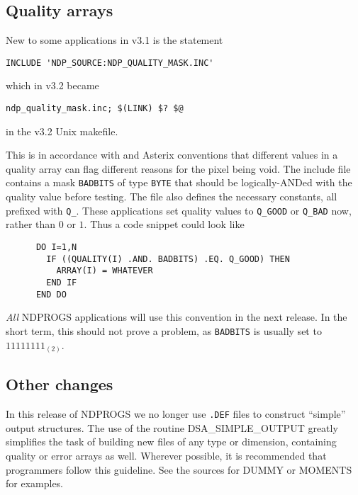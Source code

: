 \subsection{Quality arrays}

New to some applications in v3.1 is the statement

\begin{myquote}
\begin{verbatim}
INCLUDE 'NDP_SOURCE:NDP_QUALITY_MASK.INC'
\end{verbatim}
\end{myquote}

which in v3.2 became 

\begin{myquote}
\begin{verbatim}
ndp_quality_mask.inc; $(LINK) $? $@ 
\end{verbatim}
\end{myquote}

in the v3.2 Unix makefile.

This is in accordance with  and Asterix conventions that different values
in a quality array can flag different reasons for the pixel being void. The
include file contains a mask {\tt BADBITS} of type {\tt BYTE} that should be 
logically-ANDed with the quality value before testing. The file also defines 
the necessary constants, all prefixed with {\tt Q\_}. These applications set 
quality values to {\tt Q\_GOOD} or {\tt Q\_BAD} now, rather than $0$ or $1$. 
Thus a code snippet could look like

\begin{myquote}
\begin{verbatim}
      DO I=1,N
        IF ((QUALITY(I) .AND. BADBITS) .EQ. Q_GOOD) THEN
          ARRAY(I) = WHATEVER
        END IF
      END DO
\end{verbatim}
\end{myquote}

{\em All} NDPROGS applications will use this convention in the next release.
In the short term, this should not prove a problem, as {\tt BADBITS} is 
usually set to $11111111_{(2)}$.

\subsection{Other changes}

In this release of NDPROGS we no longer use {\tt .DEF} files to
construct ``simple'' output structures. The use of the routine
DSA\_SIMPLE\_OUTPUT greatly simplifies the task of building new files of any 
type or dimension, containing quality or error arrays as well. Wherever 
possible, it is recommended that programmers follow this guideline. See the 
sources for DUMMY or MOMENTS for examples.


